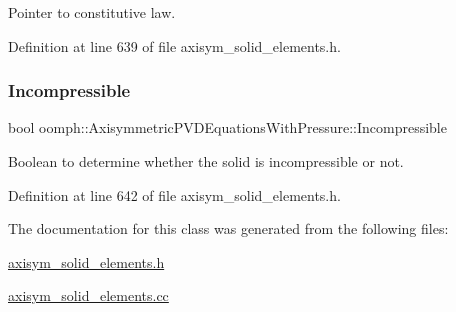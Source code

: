 Pointer to constitutive law. 



Definition at line 639 of file axisym\+\_\+solid\+\_\+elements.\+h.

\mbox{\label{classoomph_1_1AxisymmetricPVDEquationsWithPressure_a2ceef4a0290f5b475c99dd26721659d0}} 
\subsubsection{\texorpdfstring{Incompressible}{Incompressible}}
{\footnotesize\ttfamily bool oomph\+::\+Axisymmetric\+P\+V\+D\+Equations\+With\+Pressure\+::\+Incompressible\hspace{0.3cm}{\ttfamily [private]}}



Boolean to determine whether the solid is incompressible or not. 



Definition at line 642 of file axisym\+\_\+solid\+\_\+elements.\+h.



The documentation for this class was generated from the following files\+:\begin{DoxyCompactItemize}
\item 
\hyperlink{axisym__solid__elements_8h}{axisym\+\_\+solid\+\_\+elements.\+h}\item 
\hyperlink{axisym__solid__elements_8cc}{axisym\+\_\+solid\+\_\+elements.\+cc}\end{DoxyCompactItemize}
